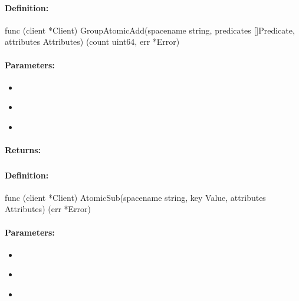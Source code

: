 \paragraph{Definition:}
\begin{gocode}
func (client *Client) GroupAtomicAdd(spacename string, predicates []Predicate, attributes Attributes) (count uint64, err *Error)
\end{gocode}

\paragraph{Parameters:}
\begin{itemize}[noitemsep]
\item {}\\

\item {}\\

\item {}\\

\end{itemize}

\paragraph{Returns:}


\pagebreak
\subsubsection{}
\label{api:Go:AtomicSub}


\paragraph{Definition:}
\begin{gocode}
func (client *Client) AtomicSub(spacename string, key Value, attributes Attributes) (err *Error)
\end{gocode}

\paragraph{Parameters:}
\begin{itemize}[noitemsep]
\item {}\\

\item {}\\

\item {}\\

\end{itemize}

